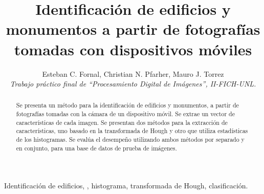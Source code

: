 \documentclass[conference,spanish,a4paper,10pt,oneside,final]{tfmpd}
\begin{document}
\title{Identificación de edificios y monumentos a partir de fotografías
tomadas con dispositivos móviles}
\author{Esteban C. Fornal, Christian N. Pfarher, Mauro J. Torrez\\
\textit{Trabajo práctico final de ``Procesamiento Digital de
Imágenes'', II-FICH-UNL.}}
\maketitle
%
%
%
%
\begin{abstract}
Se presenta un método para la identificación de edificios y monumentos, a
partir de fotografías tomadas con la cámara de un dispositivo móvil.
Se extrae un vector de características  de %
cada imagen.
Se presentan dos métodos para la extracción de características, %
uno basado en la transformada de Hough y otro que utiliza estadísticas de los
histogramas. Se evalúa el desempeño utilizando 
ambos métodos por separado y en
conjunto, para una base de datos de prueba de%
imágenes.
\end{abstract}
%
%
%
%
\begin{keywords}
Identificación%
de edificios, ,
histograma, %
transformada de Hough, clasificación.
\end{keywords}
%
%
%
%
\end{document}
